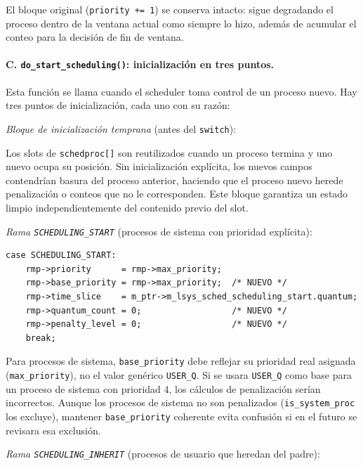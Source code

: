 \documentclass[11pt,a4paper]{article}
\begin{document}
El bloque original (\texttt{priority += 1}) se conserva intacto: sigue degradando el proceso dentro de la ventana actual como siempre lo hizo, adem\'as de acumular el conteo para la decisi\'on de fin de ventana.

\paragraph{C. \texttt{do\_start\_scheduling()}: inicializaci\'on en tres puntos.}

Esta funci\'on se llama cuando el scheduler toma control de un proceso nuevo. Hay tres puntos de inicializaci\'on, cada uno con su raz\'on:

\textit{Bloque de inicializaci\'on temprana} (antes del \texttt{switch}):


Los slots de \texttt{schedproc[]} son reutilizados cuando un proceso termina y uno nuevo ocupa su posici\'on. Sin inicializaci\'on expl\'icita, los nuevos campos contendr\'ian basura del proceso anterior, haciendo que el proceso nuevo herede penalizaci\'on o conteos que no le corresponden. Este bloque garantiza un estado limpio independientemente del contenido previo del slot.

\textit{Rama \texttt{SCHEDULING\_START}} (procesos de sistema con prioridad expl\'icita):

\begin{lstlisting}[style=cstyle,caption={Inicializaci\'on en rama \texttt{SCHEDULING\_START}}]
case SCHEDULING_START:
    rmp->priority      = rmp->max_priority;
    rmp->base_priority = rmp->max_priority;  /* NUEVO */
    rmp->time_slice    = m_ptr->m_lsys_sched_scheduling_start.quantum;
    rmp->quantum_count = 0;                  /* NUEVO */
    rmp->penalty_level = 0;                  /* NUEVO */
    break;
\end{lstlisting}

Para procesos de sistema, \texttt{base\_priority} debe reflejar su prioridad real asignada (\texttt{max\_priority}), no el valor gen\'erico \texttt{USER\_Q}. Si se usara \texttt{USER\_Q} como base para un proceso de sistema con prioridad 4, los c\'alculos de penalizaci\'on ser\'ian incorrectos. Aunque los procesos de sistema no son penalizados (\texttt{is\_system\_proc} los excluye), mantener \texttt{base\_priority} coherente evita confusi\'on si en el futuro se revisara esa exclusi\'on.

\textit{Rama \texttt{SCHEDULING\_INHERIT}} (procesos de usuario que heredan del padre):
\end{document}
